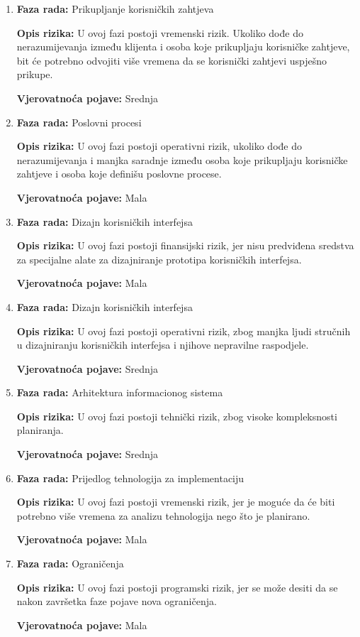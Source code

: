 \begin{enumerate}
    \item \textbf{Faza rada:} Prikupljanje korisničkih zahtjeva 

    
    \textbf{Opis rizika:} U ovoj fazi postoji vremenski rizik. Ukoliko dođe do nerazumijevanja između klijenta i osoba koje prikupljaju korisničke zahtjeve, bit će potrebno odvojiti više vremena da se korisnički zahtjevi uspješno prikupe. 

    
    \textbf{Vjerovatnoća pojave:} Srednja

    \item \textbf{Faza rada:} Poslovni procesi 

    
    \textbf{Opis rizika:} U ovoj fazi postoji operativni rizik, ukoliko dođe do nerazumijevanja i manjka saradnje između osoba koje prikupljaju korisničke zahtjeve i osoba koje definišu poslovne procese. 

    
    \textbf{Vjerovatnoća pojave:} Mala

    \item \textbf{Faza rada:} Dizajn korisničkih interfejsa 

    
    \textbf{Opis rizika:} U ovoj fazi postoji finansijski rizik, jer nisu predviđena sredstva za specijalne alate za dizajniranje prototipa korisničkih interfejsa. 

    
    \textbf{Vjerovatnoća pojave:} Mala

    \item \textbf{Faza rada:} Dizajn korisničkih interfejsa 

    
    \textbf{Opis rizika:} U ovoj fazi postoji operativni rizik, zbog manjka ljudi stručnih u dizajniranju korisničkih interfejsa i njihove nepravilne raspodjele. 

    
    \textbf{Vjerovatnoća pojave:} Srednja

    \item \textbf{Faza rada:} Arhitektura informacionog sistema 

    
    \textbf{Opis rizika:} U ovoj fazi postoji tehnički rizik, zbog visoke kompleksnosti planiranja. 

    
    \textbf{Vjerovatnoća pojave:} Srednja

    \item \textbf{Faza rada:} Prijedlog tehnologija za implementaciju 

    
    \textbf{Opis rizika:} U ovoj fazi postoji vremenski rizik, jer je moguće da će biti potrebno više vremena za analizu tehnologija nego što je planirano. 

    
    \textbf{Vjerovatnoća pojave:} Mala

    \newpage
    
    \item \textbf{Faza rada:} Ograničenja 

    
    \textbf{Opis rizika:} U ovoj fazi postoji programski rizik, jer se može desiti da se nakon završetka faze pojave nova ograničenja. 

    
    \textbf{Vjerovatnoća pojave:} Mala
\end{enumerate}

